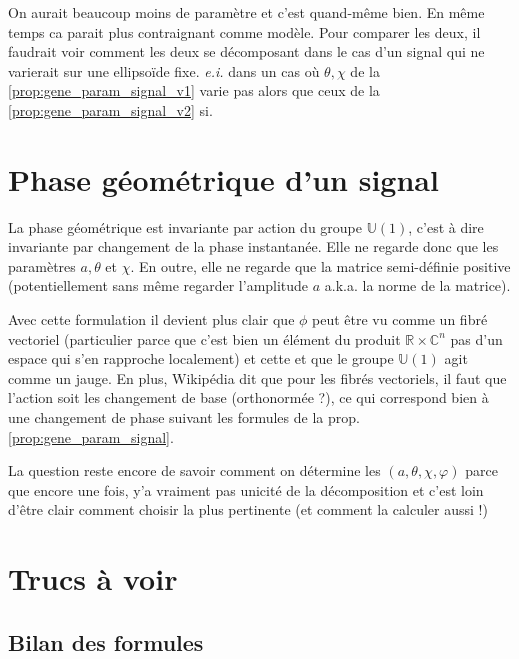 \documentclass[hidelinks, french, oneside]{article}
\newcommand{\R}{\mathbb{R}}
\newcommand{\C}{\mathbb{C}}
\theoremstyle{enonce}
\theoremstyle{special}
\theoremstyle{rqlike}
\theoremstyle{exo}
\theoremstyle{demo}
\begin{document}
On aurait beaucoup moins de paramètre et c'est quand-même bien. En même temps ca parait plus contraignant comme modèle. Pour comparer les deux, il faudrait voir comment les deux se décomposant dans le cas d'un signal qui ne varierait sur une ellipsoïde fixe. \textit{e.i.} dans un cas où $\theta,\chi$ de la \cref{prop:gene_param_signal_v1} varie pas alors que ceux de la \cref{prop:gene_param_signal_v2} si.




\setcounter{figure}{0}
\setcounter{lstlisting}{0}

\section{Phase géométrique d'un signal}\label{sec:phasegeo}

La phase géométrique est invariante par action du groupe $\mathbb{U}(1)$, c'est à dire invariante par changement de la phase instantanée. Elle ne regarde donc que les paramètres $a, \theta$ et $\chi$. En outre, elle ne regarde que la matrice semi-définie positive (potentiellement sans même regarder l'amplitude $a$ a.k.a. la norme de la matrice).

Avec cette formulation il devient plus clair que $\phi$ peut être vu comme un fibré vectoriel (particulier parce que c'est bien un élément du produit $\R\times\C^n$ pas d'un espace qui s'en rapproche localement) et cette et que le groupe $\mathbb{U}(1)$ agit comme un jauge. En plus, Wikipédia dit que pour les fibrés vectoriels, il faut que l'action soit les changement de base (orthonormée ?), ce qui correspond bien à une changement de phase suivant les formules de la prop. \ref{prop:gene_param_signal}.

La question reste encore de savoir comment on détermine les $(a,\theta,\chi,\varphi)$ parce que encore une fois, y'a vraiment pas unicité de la décomposition et c'est loin d'être clair comment choisir la plus pertinente (et comment la calculer aussi !)



\section{Trucs à voir}

\subsection{Bilan des formules}
\end{document}
